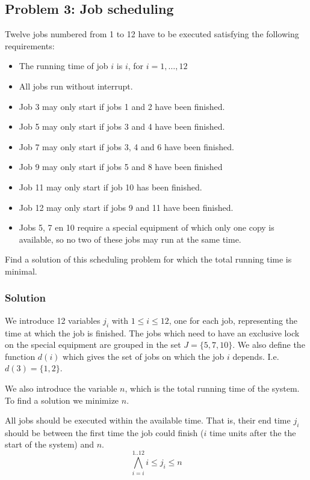 \documentclass[12pt]{article}
\begin{document}
\subsection*{Problem 3: Job scheduling}
Twelve jobs numbered from 1 to 12 have to be executed satisfying the following
requirements:
\begin{itemize}
	\item The running time of job $i$ is $i$, for $i=1,\ldots,12$
	\item All jobs run without interrupt.
	\item Job 3 may only start if jobs 1 and 2 have been finished.
	\item Job 5 may only start if jobs 3 and 4 have been finished.
	\item Job 7 may only start if jobs 3, 4 and 6 have been finished.
	\item Job 9 may only start if jobs 5 and 8 have been finished
	\item Job 11 may only start if job 10 has been finished.
	\item Job 12 may only start if jobs 9 and 11 have been finished.
	\item Jobs 5, 7 en 10 require a special equipment of which only one copy
		is available, so no two of these jobs may run at the same time.
\end{itemize}

Find a solution of this scheduling problem for which the total running time is
minimal.

\subsubsection*{Solution}
We introduce 12 variables $j_i$ with $1 \leq i \leq 12$, one for each job,
representing the time at which the job is finished. The jobs which need to have
an exclusive lock on the special equipment are grouped in the set 
$J = \{5,7,10\}$. We also define the function $d(i)$ which gives the set of jobs on which the job $i$ depends. I.e. $d(3) = \{1,2\}$.

We also introduce the variable $n$, which is the total running time of the 
system. To find a solution we minimize $n$.

\vspace{3mm}

All jobs should be executed within the available time. That is, their end time
$j_i$ should be between the first time the job could finish ($i$ time units
after the the start of the system) and $n$.
\begin{equation}
	\bigwedge_{i=i}^{1..12} i \leq j_i \leq n
\end{equation}
\end{document}

